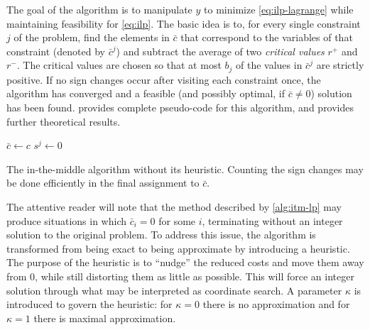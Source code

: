 The goal of the algorithm is to manipulate \(y\) to minimize \eqref{eq:ilp-lagrange} while maintaining feasibility for \eqref{eq:ilp}.
The basic idea is to, for every single constraint \(j\) of the problem, find the elements in \(\bar{c}\) that correspond to the variables of that constraint (denoted by \(\bar{c}^j\)) and subtract the average of two \emph{critical values} \(r^+\) and \(r^-\).
The critical values are chosen so that at most \(b_j\) of the values in \(\bar{c}^j\) are strictly positive.
If no sign changes occur after visiting each constraint once, the algorithm has converged and a feasible (and possibly optimal, if \(\bar{c} \neq 0\)) solution has been found.
 provides complete pseudo-code for this algorithm, and \textcites{Wedelin95}{Wedelin13} provides further theoretical results.

\begin{algorithm}[tp]
	\(\bar{c} \leftarrow c\) \;
	\(s^j \leftarrow 0\) \;

	\caption{
		The in-the-middle algorithm without its heuristic.
		Counting the sign changes may be done efficiently in the final assignment to \(\bar{c}\).
	}
	\label{alg:itm-lp}
\end{algorithm}

The attentive reader will note that the method described by \cref{alg:itm-lp} may produce situations in which \(\bar{c}_i = 0\) for some \(i\), terminating without an integer solution to the original problem.
To address this issue, the algorithm is transformed from being exact to being approximate by introducing a heuristic.
The purpose of the heuristic is to \enquote{nudge} the reduced costs and move them away from \(0\), while still distorting them as little as possible.
This will force an integer solution through what may be interpreted as coordinate search.
A parameter \(\kappa\) is introduced to govern the heuristic: for \(\kappa=0\) there is no approximation and for \(\kappa=1\) there is maximal approximation.

